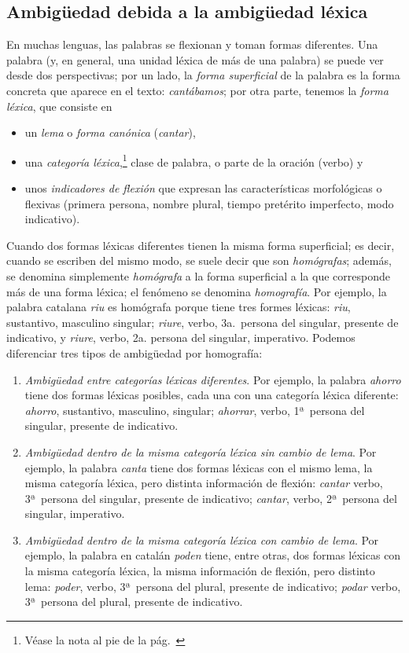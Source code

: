 \subsection{Ambigüedad debida a la ambigüedad léxica} \label{ss:amblex} En muchas lenguas, las palabras se flexionan y toman formas diferentes. Una palabra (y, en general, una unidad léxica de más de una palabra) se puede ver desde dos perspectivas; por un lado, la \emph{forma superficial} de la palabra es la forma concreta que aparece en el texto: \emph{cantábamos}; por otra parte, tenemos la \emph{forma léxica}, que consiste en \begin{itemize} \item un \emph{lema} o \emph{forma canónica} (\emph{cantar}), \item una \emph{categoría léxica},\label{pg:catlex}\footnote{Véase la nota al pie de la pág.~\pageref{pg:catgra}} clase de palabra, o parte de la oración (verbo) y \item unos \emph{indicadores de flexión} que expresan las características morfológicas o flexivas (primera persona, nombre plural, tiempo pretérito imperfecto, modo indicativo). \end{itemize} Cuando dos formas léxicas diferentes tienen la misma forma superficial; es decir, cuando se escriben del mismo modo, se suele decir que son \emph{homógrafas}\label{pg:homografia}; además, se denomina simplemente \emph{homógrafa} a la forma superficial a la que corresponde más de una forma léxica; el fenómeno se denomina \emph{homografía}. Por ejemplo, la palabra catalana \emph{riu} es homógrafa porque tiene tres formes léxicas: \emph{riu}, sustantivo, masculino singular; \emph{riure}, verbo, 3a.\ persona del singular, presente de indicativo, y \emph{riure}, verbo, 2a. persona del singular, imperativo. Podemos diferenciar tres tipos de ambigüedad por homografía: \begin{enumerate} \item \emph{Ambigüedad entre categorías léxicas diferentes}. Por ejemplo, la palabra \emph{ahorro} tiene dos formas léxicas posibles, cada una con una categoría léxica diferente: \emph{ahorro}, sustantivo, masculino, singular; \emph{ahorrar}, verbo, 1ª\ persona del singular, presente de indicativo. \item \emph{Ambigüedad dentro de la misma categoría léxica sin cambio de lema}. Por ejemplo, la palabra \emph{canta} tiene dos formas léxicas con el mismo lema, la misma categoría léxica, pero distinta información de flexión: \emph{cantar} verbo, 3ª\ persona del singular, presente de indicativo; \emph{cantar}, verbo, 2ª\ persona del singular, imperativo. \item \emph{Ambigüedad dentro de la misma categoría léxica con cambio de lema}. Por ejemplo, la palabra en catalán \emph{poden} tiene, entre otras, dos formas léxicas con la misma categoría léxica, la misma información de flexión, pero distinto lema: \emph{poder}, verbo, 3ª\ persona del plural, presente de indicativo; \emph{podar} verbo, 3ª\ persona del plural, presente de indicativo. \end{enumerate} 


